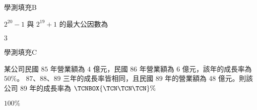     \begin{QUESTION}
        \begin{ExamInfo}{91}{學測}{填充}{B}
        \end{ExamInfo}
        \begin{ExamAnsRateInfo}{50}{70}{51}{29}
        \end{ExamAnsRateInfo}
        \begin{QBODY}
            $2^{20}-1$ 與 $2^{19}+1$ 的最大公因數為 
            \TCNBOX{\TCN}
        \end{QBODY}
        \begin{QFROMS}
        \end{QFROMS}
        \begin{QTAGS}\end{QTAGS}
        \begin{QANS}
            $3$
        \end{QANS}
        \begin{QSOLLIST}
        \end{QSOLLIST}
        \begin{QEMPTYSPACE}
        \end{QEMPTYSPACE}
    \end{QUESTION}
    \begin{QUESTION}
        \begin{ExamInfo}{91}{學測}{填充}{C}
        \end{ExamInfo}
        \begin{ExamAnsRateInfo}{38}{70}{32}{12}
        \end{ExamAnsRateInfo}
        \begin{QBODY}
            某公司民國 $85$ 年營業額為 $4$ 億元，民國 $86$ 年營業額為 $6$ 億元，該年的成長率為 $50\%$。 $87$、$88$、$89$ 三年的成長率皆相同，且民國 $89$ 年的營業額為 48 億元。則該公司 89 年的成長率為 
            $\TCNBOX{\TCN\TCN\TCN} \%$
        \end{QBODY}
        \begin{QFROMS}
        \end{QFROMS}
        \begin{QTAGS}\end{QTAGS}
        \begin{QANS}
            $100\%$
        \end{QANS}
        \begin{QSOLLIST}
        \end{QSOLLIST}
        \begin{QEMPTYSPACE}
        \end{QEMPTYSPACE}
    \end{QUESTION}
